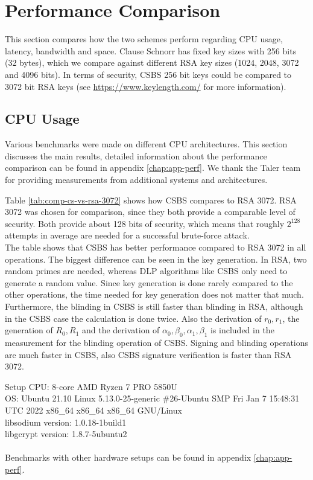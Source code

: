 \section{Performance Comparison}
\label{sec:disc-perf-comp}
This section compares how the two schemes perform regarding CPU usage, latency, bandwidth and space.
Clause Schnorr has fixed key sizes with 256 bits (32 bytes), which we compare against different RSA key sizes (1024, 2048, 3072 and 4096 bits).
In terms of security, \gls{CSBS} 256 bit keys could be compared to 3072 bit RSA keys (see \url{https://www.keylength.com/} for more information).

\subsection{CPU Usage}
Various benchmarks were made on different CPU architectures.
This section discusses the main results, detailed information about the performance comparison can be found in appendix \ref{chap:app-perf}.
We thank the Taler team for providing measurements from additional systems and architectures.

Table \ref{tab:comp-cs-vs-rsa-3072} shows how \gls{CSBS} compares to RSA 3072.
RSA 3072 was chosen for comparison, since they both provide a comparable level of security.
Both provide about 128 bits of security, which means that roughly $2^{128}$ attempts in average are needed for a successful brute-force attack.\\
The table shows that \gls{CSBS} has better performance compared to RSA 3072 in all operations.
The biggest difference can be seen in the key generation.
In RSA, two random primes are needed, whereas \ac{DLP} algorithms like \gls{CSBS} only need to generate a random value.
Since key generation is done rarely compared to the other operations, the time needed for key generation does not matter that much.\\
Furthermore, the blinding in \gls{CSBS} is still faster than blinding in RSA, although in the \gls{CSBS} case the calculation is done twice. Also the derivation of $r_0,r_1$, the generation of $R_0,R_1$ and the derivation of $\alpha_0, \beta_0, \alpha_1, \beta_1$ is included in the measurement for the blinding operation of \gls{CSBS}.
Signing and blinding operations are much faster in \gls{CSBS}, also \gls{CSBS} signature verification is faster than RSA 3072.

\begin{bfhBox}{Setup}
	CPU: 8-core AMD Ryzen 7 PRO 5850U \\
    OS: Ubuntu 21.10 Linux 5.13.0-25-generic \#26-Ubuntu SMP Fri Jan 7 15:48:31 UTC 2022 x86\_64 x86\_64 x86\_64 GNU/Linux \\
    libsodium version: 1.0.18-1build1 \\
    libgcrypt version: 1.8.7-5ubuntu2 \\\\
    Benchmarks with other hardware setups can be found in appendix \ref{chap:app-perf}.
\end{bfhBox}


